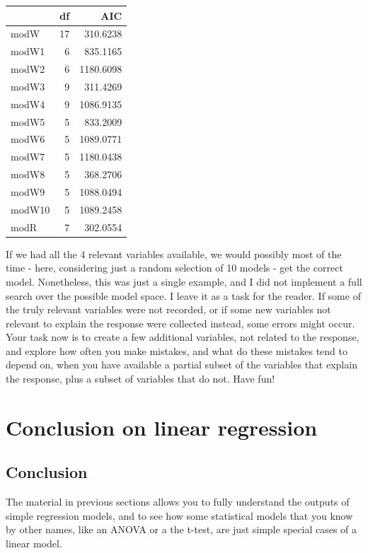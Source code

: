 \documentclass[
]{book}
\begin{document}
\begin{tabular}{l|r|r}
\hline
  & df & AIC\\
\hline
modW & 17 & 310.6238\\
\hline
modW1 & 6 & 835.1165\\
\hline
modW2 & 6 & 1180.6098\\
\hline
modW3 & 9 & 311.4269\\
\hline
modW4 & 9 & 1086.9135\\
\hline
modW5 & 5 & 833.2009\\
\hline
modW6 & 5 & 1089.0771\\
\hline
modW7 & 5 & 1180.0438\\
\hline
modW8 & 5 & 368.2706\\
\hline
modW9 & 5 & 1088.0494\\
\hline
modW10 & 5 & 1089.2458\\
\hline
modR & 7 & 302.0554\\
\hline
\end{tabular}

If we had all the 4 relevant variables available, we would possibly most of the time - here, considering just a random selection of 10 models - get the correct model. Nonetheless, this was just a single example, and I did not implement a full search over the possible model space. I leave it as a task for the reader. If some of the truly relevant variables were not recorded, or if some new variables not relevant to explain the response were collected instead, some errors might occur. Your task now is to create a few additional variables, not related to the response, and explore how often you make mistakes, and what do these mistakes tend to depend on, when you have available a partial subset of the variables that explain the response, plus a subset of variables that do not. Have fun!

\section{Conclusion on linear regression}\label{conclusion-on-linear-regression}

\subsection{Conclusion}\label{conclusion}

The material in previous sections allows you to fully understand the outputs of simple regression models, and to see how some statistical models that you know by other names, like an ANOVA or a the t-test, are just simple special cases of a linear model.
\end{document}
